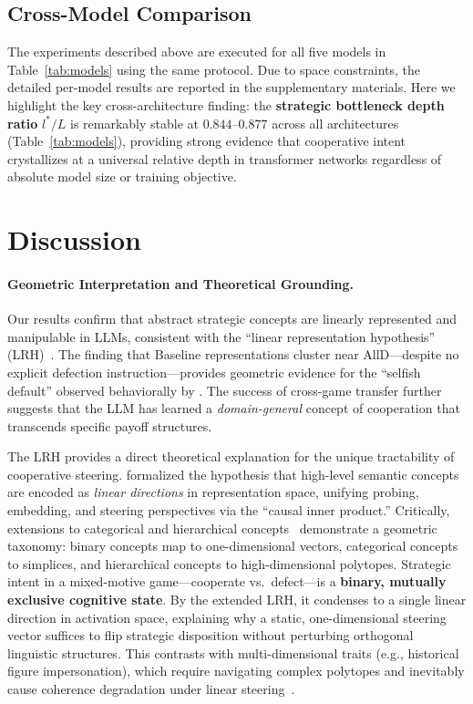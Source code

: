 \documentclass{article}
\begin{document}
\subsection{Cross-Model Comparison}
\label{sec:exp_crossmodel}

The experiments described above are executed for all five models in Table~\ref{tab:models} using the same protocol. Due to space constraints, the detailed per-model results are reported in the supplementary materials. Here we highlight the key cross-architecture finding: the \textbf{strategic bottleneck depth ratio} $l^*/L$ is remarkably stable at $0.844$--$0.877$ across all architectures (Table~\ref{tab:models}), providing strong evidence that cooperative intent crystallizes at a universal relative depth in transformer networks regardless of absolute model size or training objective.

\section{Discussion}
\label{sec:discussion}

\paragraph{Geometric Interpretation and Theoretical Grounding.}
Our results confirm that abstract strategic concepts are linearly represented and manipulable in LLMs, consistent with the ``linear representation hypothesis'' (LRH)~\citep{park2024linear, nanda2023emergent}. The finding that Baseline representations cluster near AllD---despite no explicit defection instruction---provides geometric evidence for the ``selfish default'' observed behaviorally by \citet{brookman2023playing}. The success of cross-game transfer further suggests that the LLM has learned a \textit{domain-general} concept of cooperation that transcends specific payoff structures.

The LRH provides a direct theoretical explanation for the unique tractability of cooperative steering. \citet{park2024linear} formalized the hypothesis that high-level semantic concepts are encoded as \textit{linear directions} in representation space, unifying probing, embedding, and steering perspectives via the ``causal inner product.'' Critically, extensions to categorical and hierarchical concepts~\citep{park2025geometry} demonstrate a geometric taxonomy: binary concepts map to one-dimensional vectors, categorical concepts to simplices, and hierarchical concepts to high-dimensional polytopes. Strategic intent in a mixed-motive game---cooperate vs.\ defect---is a \textbf{binary, mutually exclusive cognitive state}. By the extended LRH, it condenses to a single linear direction in activation space, explaining why a static, one-dimensional steering vector suffices to flip strategic disposition without perturbing orthogonal linguistic structures. This contrasts with multi-dimensional traits (e.g., historical figure impersonation), which require navigating complex polytopes and inevitably cause coherence degradation under linear steering~\citep{bas2025steer}.
\end{document}
